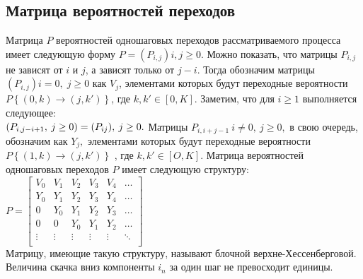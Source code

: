 \documentclass[12pt, a4paper]{article}
\begin{document}
\subsection{Матрица вероятностей переходов}
Матрица $P$ вероятностей одношаговых переходов рассматриваемого
процесса имеет следующую форму $P = (P_{i,j})i,j \geq 0$. Можно показать, что
матрицы $P_{i,j}$ не зависят от $i$ и $j$, а зависят только от $j - i$. Тогда
обозначим матрицы $(P_{i,j})i=0,\; j \geq 0$  как $ V_{j}$, элементами которых будут переходные
вероятности $P\left\{(0, k) \rightarrow (j, k') \right\}$, где $ k, k' \in [0, K]$. Заметим, что для $i \geq 1$ выполняется следующее:\\
$(P_{i, j-i+1},\: j\geq 0) = (P_{ij}),\: j \geq 0 .\\$
Матрицы $P_{i,i + j - 1}\: i\neq 0,\: j \geq 0,$ в свою очередь, обозначим как $Y_{j},$ элементами которых
будут переходные вероятности $P\left\{(1, k) \rightarrow (j, k') \right\}$ , где $ k, k' \in [O,K]$. Матрица
вероятностей одношаговых переходов $P$ имеет следующую структуру: \\
$P=\begin{bmatrix}
V_{0} & V_{1} & V_{2} & V_{3} & V{_4} & \ldots\\
Y_{0} & Y_{1} & Y_{2} & Y_{3} & Y{_4} & \ldots\\
0 & Y_{0} & Y_{1} & Y_{2} & Y_{3} & \ldots\\
0 & 0 & Y_{0} & Y_{1} & Y_{2} & \ldots\\
\vdots & \vdots & \vdots & \vdots & \vdots & \ddots\\
\end{bmatrix}$\\
Матрицу, имеющие такую структуру, называют блочной верхне-Хессенберговой. Величина скачка вниз компоненты $i_{n}$ за один шаг не превосходит
единицы.
\end{document}
